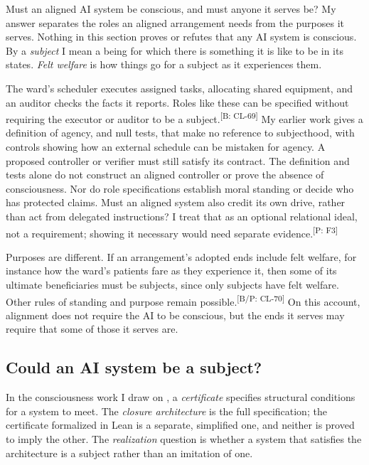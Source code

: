 \documentclass[pdflatex,sn-basic]{sn-jnl}%
\newcommand{\slot}[1]{}%
\newcommand{\claim}[2]{\ifannotated\textsuperscript{\textcolor{blue!60!black}{\tiny[#1: #2]}}\fi}
\newcommand{\Selfcite}[1]{\ifanonymous\citet{#1}\else My earlier work \citep{#1}\fi}
\begin{document}
\slot{6.1}
Must an aligned AI system be conscious, and must anyone it serves be? My answer separates the roles an aligned arrangement needs from the purposes it serves. Nothing in this section proves or refutes that any AI system is conscious. By a \emph{subject} I mean a being for which there is something it is like to be in its states. \emph{Felt welfare} is how things go for a subject as it experiences them.

The ward's scheduler executes assigned tasks, allocating shared equipment, and an auditor checks the facts it reports. Roles like these can be specified without requiring the executor or auditor to be a subject.\claim{B}{CL-69} \Selfcite{tsiokos2026agents} gives a definition of agency, and null tests, that make no reference to subjecthood, with controls showing how an external schedule can be mistaken for agency. A proposed controller or verifier must still satisfy its contract. The definition and tests alone do not construct an aligned controller or prove the absence of consciousness. Nor do role specifications establish moral standing or decide who has protected claims. Must an aligned system also credit its own drive, rather than act from delegated instructions? I treat that as an optional relational ideal, not a requirement; showing it necessary would need separate evidence.\claim{P}{F3}

Purposes are different. If an arrangement's adopted ends include felt welfare, for instance how the ward's patients fare as they experience it, then some of its ultimate beneficiaries must be subjects, since only subjects have felt welfare. Other rules of standing and purpose remain possible.\claim{B/P}{CL-70} On this account, alignment does not require the AI to be conscious, but the ends it serves may require that some of those it serves are.

\subsection{Could an AI system be a subject?}\label{sec:realization}

\slot{6.2}
In the consciousness work I draw on \citep{tsiokos2026consciousness}, a \emph{certificate} specifies structural conditions for a system to meet. The \emph{closure architecture} is the full specification; the certificate formalized in Lean is a separate, simplified one, and neither is proved to imply the other. The \emph{realization} question is whether a system that satisfies the architecture is a subject rather than an imitation of one.
\end{document}

